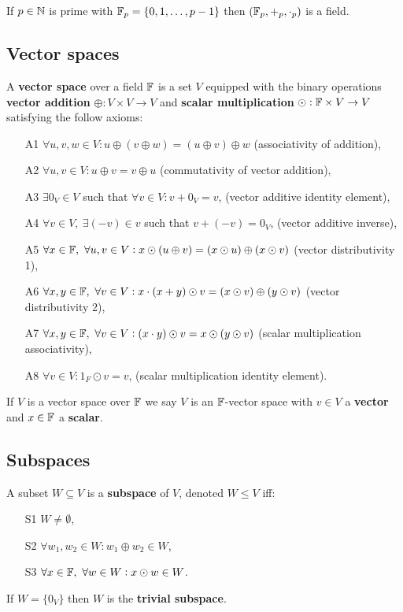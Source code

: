 \documentclass[../Year1/Year1.tex]{subfiles}
\begin{document}
\begin{theorem}
    If $p\in\mathbb{N}$ is prime with $\mathbb{F}_p = \{0,1,\ldots,p-1\}$ then $(\mathbb{F}_p,+_p,\cdot_p)$ is a field.
\end{theorem}

\subsection{Vector spaces}
\begin{definition}
    A \textbf{vector space} over a field $\mathbb{F}$ is a set $V$ equipped with the binary operations \textbf{vector addition} $\oplus:V\times V\rightarrow V$ and \textbf{scalar multiplication} $\odot:\mathbb{F}\times V\rightarrow V$ satisfying the follow axioms:
    \begin{enumerate}
        \item[A1] $\forall u,v,w \in V: u\oplus(v\oplus w)=(u\oplus v)\oplus w$ (associativity of addition),
        \item[A2] $\forall u,v \in V: u\oplus v=v\oplus u$ (commutativity of vector addition),
        \item[A3] $\exists 0_V \in V$ such that $\forall v\in V: v + 0_V = v$, (vector additive identity element),
        \item[A4] $\forall v\in V, \ \exists (-v)\in v$ such that $v+(-v)=0_V$, (vector additive inverse),

        \item[A5] $\forall x \in \mathbb{F}, \ \forall u,v\in V: x \odot (u\oplus v) =(x\odot u) \oplus (x\odot v)$ (vector distributivity 1),
        \item[A6] $\forall x,y \in \mathbb{F}, \ \forall v\in V: x\cdot (x+y)\odot v =(x\odot v) \oplus (y\odot v)$ (vector distributivity 2),
        \item[A7] $\forall x,y \in \mathbb{F}, \ \forall v\in V: (x\cdot y)\odot v = x\odot (y\odot v)$ (scalar multiplication associativity),
        \item[A8] $\forall v\in V: 1_F\odot v = v$, (scalar multiplication identity element).
    \end{enumerate}
    If $V$ is a vector space over $\mathbb{F}$ we say $V$ is an $\mathbb{F}$-vector space with $v\in V$ a \textbf{vector} and $x\in\mathbb{F}$ a \textbf{scalar}.
\end{definition}

\subsection{Subspaces}
\begin{definition}[Subspace]
    A subset $W\subseteq V$ is a \textbf{subspace} of $V$, denoted $W\leq V$ iff:
    \begin{enumerate}
        \item[S1] $W\neq \emptyset$,
        \item[S2] $\forall w_1, w_2 \in W: w_1 \oplus w_2\in W$,
        \item[S3] $\forall x\in\mathbb{F}, \  \forall w\in W: x\odot w\in W$.
    \end{enumerate}
    If $W=\{0_V\}$ then $W$ is the \textbf{trivial subspace}.
\end{definition}
\end{document}
